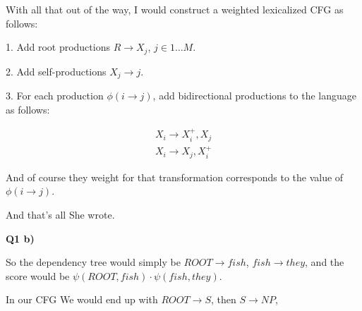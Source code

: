\documentclass{article}
\begin{document}
	With all that out of the way, I would construct a weighted lexicalized CFG as follows: 
	
	1. Add root productions $R \to X_j$, $j\in 1\ldots M$.
	
	2. Add self-productions $X_j \to j$.
	
	3. For each production $\phi(i\to j)$, add bidirectional productions to the language as follows:
	
	\begin{align}
		X_i \to X_i^+, X_j\\
		X_i \to X_j, X_i^+
	\end{align}
	
	And of course they weight for that transformation corresponds to the value of $\phi(i\to j)$.
	
	And that's all She wrote.
	
\textbf{Q1 b)}

	So the dependency tree would simply be $ROOT\to fish$, $fish\to they$, and the score would be $\psi(ROOT, fish)\cdot \psi(fish, they)$.
	
	In our CFG We would end up with $ROOT\to S$, then $S\to NP$, 
	
	
	
	
	
	
	
\end{document}
